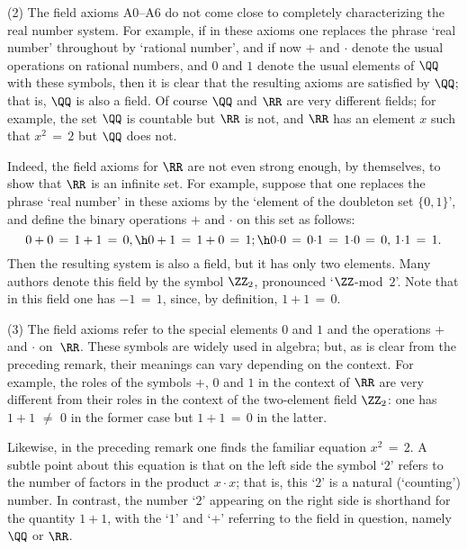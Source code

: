 \V

        (2) The field axioms A0--A6 do not come close to completely characterizing the real number system.
    For example, if in these axioms one replaces the phrase `real number' throughout by `rational number',
    and if now $+$ and ${\cdot}$ denote the usual operations on rational numbers,
    and $0$ and $1$ denote the usual elements of ${\QQ}$ with these symbols, then it is clear that the resulting axioms are satisfied by ${\QQ}$; that is, ${\QQ}$ is also a field. 
    Of course ${\QQ}$ and ${\RR}$ are very different fields; for example, the set ${\QQ}$ is countable but ${\RR}$ is not,
    and ${\RR}$ has an element $x$ such that $x^{2} \,=\, 2$ but ${\QQ}$ does not.

       Indeed, the field axioms for ${\RR}$ are not even strong enough, by themselves, to show that ${\RR}$ is an infinite set.
    For example, suppose that one replaces the phrase `real number' in these axioms by the `element of the doubleton set $\{0,1\}$',
    and define the binary operations $+$ and ${\cdot}$ on this set as follows:
        \begin{displaymath}
        0+0 \,=\, 1+1 \,=\, 0, \h 0+1 \,=\, 1+0 \,=\, 1; \h
        0{\cdot}0 \,=\, 0{\cdot}1 \,=\, 1{\cdot}0 \,=\, 0, \, 1{\cdot}1 \,=\, 1.
        \end{displaymath}
    Then the resulting system is also a field, but it has only two elements. Many authors denote this field by the symbol ${\ZZ}_{2}$,
    pronounced `${\ZZ}$-mod~$2$'. Note that in this field one has $-1 \,=\, 1$, since, by definition, $1+1 \,=\, 0$.


\V

        (3) The field axioms refer to the special elements $0$ and $1$ and the operations $+$ and ${\cdot}$ on~${\RR}$.
    These symbols are widely used in algebra; but, as is clear from the preceding remark, their meanings can vary depending on the context.
    For example, the roles of the symbols $+$, $0$ and $1$ in the context of ${\RR}$ are very different from their roles in the context of the two-element field ${\ZZ}_{2}$:
    one has $1+1 \,\,{\neq}\,\, 0$ in the former case but $1+1 \,=\,0$ in the latter.

        Likewise, in the preceding remark one finds the familiar equation $x^{2} \,=\, 2$.
    A subtle point about this equation is that on the left side the symbol `$2$' refers to the number of factors in the product $x{\cdot}x$;
    that is, this `$2$' is a natural (`counting') number. In contrast, the number `$2$'
    appearing on the right side is shorthand for the quantity $1+1$, with the `$1$' and `$+$' referring to the field in question, namely ${\QQ}$ or ${\RR}$.

